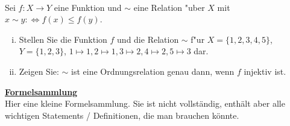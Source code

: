 \\
Sei $f:X\to Y$ eine Funktion und $\sim$ eine Relation "uber $X$ mit $x\sim y:\Leftrightarrow f(x)\leq f(y)$.
\begin{enumerate}[(i)]
    \item Stellen Sie die Funktion $f$ und die Relation $\sim$ f"ur $X=\{1,2,3,4,5\}$, $Y=\{1,2,3\}$, $1\mapsto 1, 2\mapsto 1, 3\mapsto 2, 4\mapsto 2, 5\mapsto 3$ dar.
    \item Zeigen Sie: $\sim$ ist eine Ordnungsrelation genau dann, wenn $f$ injektiv ist.
\end{enumerate}
\hspace{5cm}
\newpage
\underline{\textbf{Formelsammlung}}\\
Hier eine kleine Formelsammlung. Sie ist nicht vollständig, enthält aber alle wichtigen Statements / Definitionen, die man brauchen könnte.

